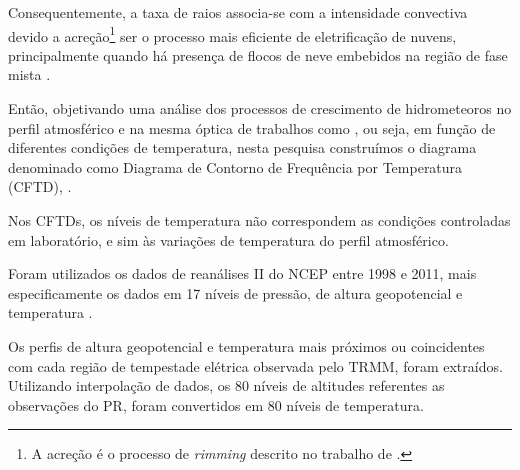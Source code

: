 Consequentemente, a taxa de raios associa-se com a intensidade convectiva devido a acreção\footnote{A acreção é o processo de \textit{rimming} descrito no trabalho de .} ser o processo mais eficiente de eletrificação de nuvens, principalmente quando há presença de flocos de neve embebidos na região de fase mista \cite{Takahashi1978,Takahashi2002}. 

Então, objetivando uma análise dos processos de crescimento de hidrometeoros no perfil atmosférico e na mesma óptica de trabalhos como , ou seja, em função de diferentes condições de temperatura, nesta pesquisa construímos o diagrama denominado como Diagrama de Contorno de Frequência por Temperatura (CFTD), .

Nos CFTDs, os níveis de temperatura não correspondem as condições controladas em laboratório, e sim às variações de temperatura do perfil atmosférico. 

Foram utilizados os dados de reanálises II do NCEP entre 1998 e 2011, mais especificamente os dados em 17 níveis de pressão, de altura geopotencial e temperatura \cite{kanamitsu}. 

Os perfis de altura geopotencial e temperatura mais próximos ou coincidentes com cada região de tempestade elétrica observada pelo TRMM, foram extraídos. Utilizando interpolação de dados, os 80 níveis de altitudes referentes as observações do PR, foram convertidos em 80 níveis de temperatura.






